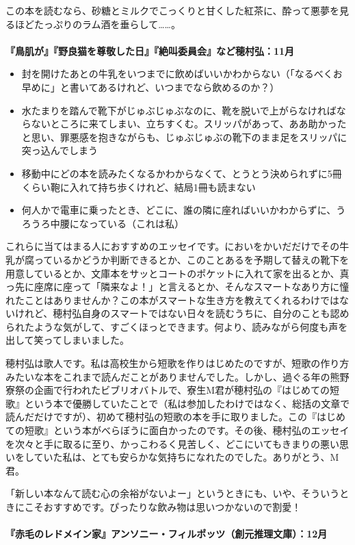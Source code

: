 この本を読むなら、砂糖とミルクでこっくりと甘くした紅茶に、酔って悪夢を見るほどたっぷりのラム酒を垂らして……。
\\
\\
\textbf{『鳥肌が』『野良猫を尊敬した日』『絶叫委員会』など穂村弘：11月}
\begin{itemize}
\item
封を開けたあとの牛乳をいつまでに飲めばいいかわからない（「なるべくお早めに」と書いてあるけれど、いつまでなら飲めるのか？）
\item
水たまりを踏んで靴下がじゅぶじゅぶなのに、靴を脱いで上がらなければならないところに来てしまい、立ちすくむ。スリッパがあって、ああ助かったと思い、罪悪感を抱きながらも、じゅぶじゅぶの靴下のまま足をスリッパに突っ込んでしまう
\item
移動中にどの本を読みたくなるかわからなくて、とうとう決められずに5冊くらい鞄に入れて持ち歩くけれど、結局1冊も読まない
\item
何人かで電車に乗ったとき、どこに、誰の隣に座ればいいかわからずに、うろうろ中腰になっている（これは私）
\end{itemize}

これらに当てはまる人におすすめのエッセイです。においをかいだだけでその牛乳が腐っているかどうか判断できるとか、このことあるを予期して替えの靴下を用意しているとか、文庫本をサッとコートのポケットに入れて家を出るとか、真っ先に座席に座って「隣来なよ！」と言えるとか、そんなスマートなあり方に憧れたことはありませんか？この本がスマートな生き方を教えてくれるわけではないけれど、穂村弘自身のスマートではない日々を読むうちに、自分のことも認められたような気がして、すごくほっとできます。何より、読みながら何度も声を出して笑ってしまいました。

穂村弘は歌人です。私は高校生から短歌を作りはじめたのですが、短歌の作り方みたいな本をこれまで読んだことがありませんでした。しかし、過ぐる年の熊野寮祭の企画で行われたビブリオバトルで、寮生M君が穂村弘の『はじめての短歌』という本で優勝していたことで（私は参加したわけではなく、総括の文章で読んだだけですが）、初めて穂村弘の短歌の本を手に取りました。この『はじめての短歌』という本がべらぼうに面白かったのです。その後、穂村弘のエッセイを次々と手に取るに至り、かっこわるく見苦しく、どこにいてもきまりの悪い思いをしていた私は、とても安らかな気持ちになれたのでした。ありがとう、M君。

「新しい本なんて読む心の余裕がないよー」というときにも、いや、そういうときにこそおすすめです。ぴったりな飲み物は思いつかないので割愛！
\\
\\
\textbf{『赤毛のレドメイン家』アンソニー・フィルポッツ（創元推理文庫）：12月}

